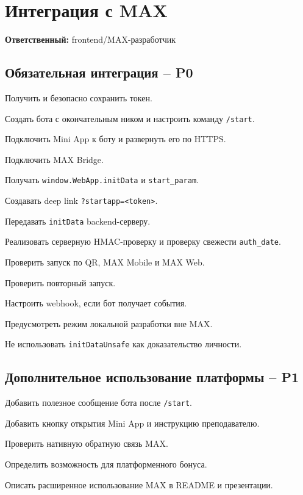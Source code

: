 \documentclass[11pt,a4paper]{article}
\newcommand{\PZero}{\textcolor{PZero}{\textbf{P0}}}
\newcommand{\POne}{\textcolor{POne}{\textbf{P1}}}
\newcommand{\owner}[1]{\textcolor{Muted}{\textbf{Ответственный:} #1}}
\newcommand{\code}[1]{\texttt{#1}}
\begin{document}
\section{Интеграция с MAX}
\owner{frontend/MAX-разработчик}

\subsection{Обязательная интеграция -- \PZero}
\begin{tasklist}
  \item Получить и безопасно сохранить токен.
  \item Создать бота с окончательным ником и настроить команду \code{/start}.
  \item Подключить Mini App к боту и развернуть его по HTTPS.
  \item Подключить MAX Bridge.
  \item Получать \code{window.WebApp.initData} и \code{start\_param}.
  \item Создавать deep link \code{?startapp=<token>}.
  \item Передавать \code{initData} backend-серверу.
  \item Реализовать серверную HMAC-проверку и проверку свежести \code{auth\_date}.
  \item Проверить запуск по QR, MAX Mobile и MAX Web.
  \item Проверить повторный запуск.
  \item Настроить webhook, если бот получает события.
  \item Предусмотреть режим локальной разработки вне MAX.
  \item Не использовать \code{initDataUnsafe} как доказательство личности.
\end{tasklist}

\subsection{Дополнительное использование платформы -- \POne}
\begin{tasklist}
  \item Добавить полезное сообщение бота после \code{/start}.
  \item Добавить кнопку открытия Mini App и инструкцию преподавателю.
  \item Проверить нативную обратную связь MAX.
  \item Определить возможность для платформенного бонуса.
  \item Описать расширенное использование MAX в README и презентации.
\end{tasklist}
\end{document}
